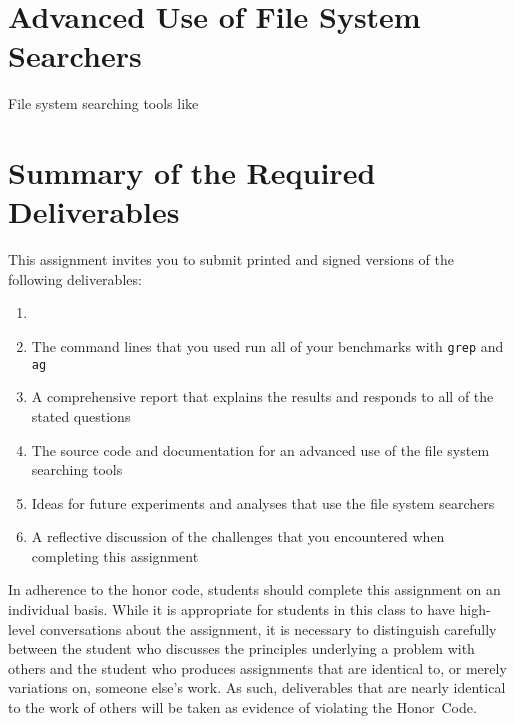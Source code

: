 \section*{Advanced Use of File System Searchers}

File system searching tools like

\section*{Summary of the Required Deliverables}

This assignment invites you to submit printed and signed versions of the following deliverables: 

\begin{enumerate}

  \item 

  \item The command lines that you used run all of your benchmarks with {\tt grep} and {\tt ag} 

  \item A comprehensive report that explains the results and responds to all of the stated questions 

  \item The source code and documentation for an advanced use of the file system searching tools

  \item Ideas for future experiments and analyses that use the file system searchers 

  \item A reflective discussion of the challenges that you encountered when completing this assignment

\end{enumerate}

In adherence to the honor code, students should complete this assignment on an individual basis. While it is appropriate
for students in this class to have high-level conversations about the assignment, it is necessary to distinguish
carefully between the student who discusses the principles underlying a problem with others and the student who produces
assignments that are identical to, or merely variations on, someone else's work.  As such, deliverables that are nearly
identical to the work of others will be taken as evidence of violating the \mbox{Honor Code}.  

  
